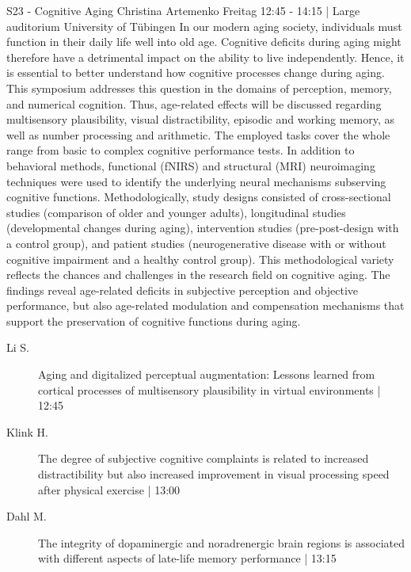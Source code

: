 
            \begin{symposium}
            {S23 - Cognitive Aging}
            {Christina Artemenko}
            {Freitag 12:45 - 14:15 | Large auditorium}
            {University of Tübingen}
            In our modern aging society, individuals must function in their daily life well into old age. Cognitive deficits during aging might therefore have a detrimental impact on the ability to live independently. Hence, it is essential to better understand how cognitive processes change during aging.
This symposium addresses this question in the domains of perception, memory, and numerical cognition. Thus, age-related effects will be discussed regarding multisensory plausibility, visual distractibility, episodic and working memory, as well as number processing and arithmetic. The employed tasks cover the whole range from basic to complex cognitive performance tests.
In addition to behavioral methods, functional (fNIRS) and structural (MRI) neuroimaging techniques were used to identify the underlying neural mechanisms subserving cognitive functions. Methodologically, study designs consisted of cross-sectional studies (comparison of older and younger adults), longitudinal studies (developmental changes during aging), intervention studies (pre-post-design with a control group), and patient studies (neurogenerative disease with or without cognitive impairment and a healthy control group). This methodological variety reflects the chances and challenges in the research field on cognitive aging.
The findings reveal age-related deficits in subjective perception and objective performance, but also age-related modulation and compensation mechanisms that support the preservation of cognitive functions during aging.
            \begin{description}    
            
                \item [ Li S.] Aging and digitalized perceptual augmentation: Lessons learned from cortical processes of multisensory plausibility in virtual environments \textcolor{mygray}{ | 12:45}    
                
                \item [ Klink H.] The degree of subjective cognitive complaints is related to increased distractibility but also increased improvement in visual processing speed after physical exercise \textcolor{mygray}{ | 13:00}    
                
                \item [ Dahl M.] The integrity of dopaminergic and noradrenergic brain regions is associated with different aspects of late-life memory performance \textcolor{mygray}{ | 13:15}    
                

\end{description}
\end{symposium}
